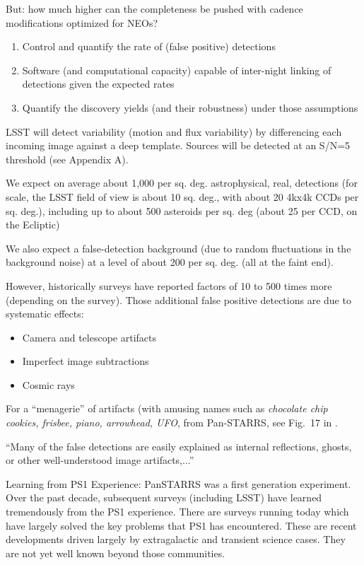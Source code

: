 \documentclass[12pt,preprint]{aastex}
\begin{document}
But: how much higher can the completeness be pushed with cadence
modifications optimized for NEOs? 


\begin{enumerate} 
\item Control and quantify the rate of (false positive) detections
\item Software (and computational capacity) capable of inter-night linking of detections given the expected rates
\item Quantify the discovery yields (and their robustness) under those assumptions
\end{enumerate} 


LSST will detect variability (motion and flux variability) by
differencing each incoming image against a deep template.
Sources will be detected at an S/N=5 threshold (see Appendix A). 

We expect on average about 1,000 per sq. deg. astrophysical, real,
detections (for scale, the LSST field of view is about 10 sq. deg.,
with about 20 4kx4k CCDs per sq. deg.), including up to about 500 
asteroids per sq. deg (about 25 per CCD, on the Ecliptic)

We also expect a false-detection background (due to random
fluctuations in the background noise) at a level of about 200 per
sq. deg. (all at the faint end). 

However, historically surveys have reported factors of 10 to 500 times
more (depending on the survey). Those additional false positive
detections are due to systematic effects: 
\begin{itemize} 
\item Camera and telescope artifacts
\item Imperfect image subtractions
\item Cosmic rays
\end{itemize} 

For a ``menagerie'' of artifacts (with amusing names such as 
{\it chocolate chip cookies, frisbee, piano, arrowhead, UFO}, from
Pan-STARRS, see Fig.~17 in \cite{denneau13}. 


``Many of the false detections are easily explained as internal
reflections, ghosts, or other well-understood image artifacts,...''


Learning from PS1 Experience: PanSTARRS was a first generation
experiment. Over the past decade, subsequent surveys (including LSST) 
have learned tremendously from the PS1 experience. There are surveys 
running today which have largely solved the key problems that PS1 has encountered.
These are recent developments driven largely by extragalactic and
transient science cases. They are not yet well known beyond those
communities.
 
\end{document}
